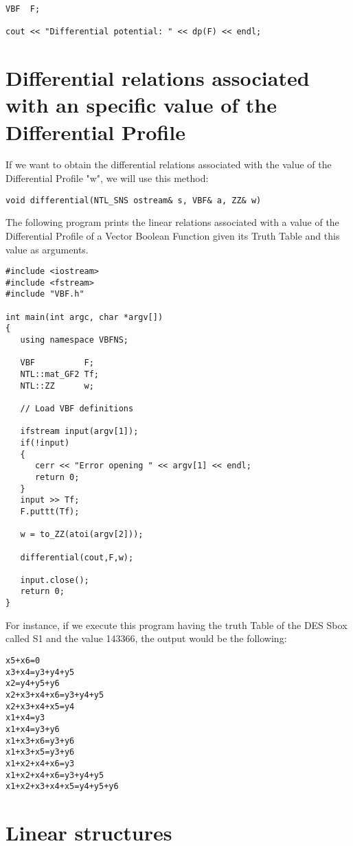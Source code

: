 \begin{verbatim}
VBF  F;

cout << "Differential potential: " << dp(F) << endl;
\end{verbatim}

\section{Differential relations associated with an specific value of the Differential Profile}

If we want to obtain the differential relations associated with the value of the Differential Profile "w", we will use this method:

\begin{verbatim}
void differential(NTL_SNS ostream& s, VBF& a, ZZ& w)
\end{verbatim}

The following program prints the linear relations associated with a value of the Differential Profile of a Vector Boolean Function given its Truth Table and this value as arguments.

\begin{verbatim}
#include <iostream>
#include <fstream>
#include "VBF.h"

int main(int argc, char *argv[])
{
   using namespace VBFNS;

   VBF          F;
   NTL::mat_GF2 Tf;
   NTL::ZZ      w;

   // Load VBF definitions

   ifstream input(argv[1]);
   if(!input)
   {
      cerr << "Error opening " << argv[1] << endl;
      return 0;
   }
   input >> Tf;
   F.puttt(Tf);

   w = to_ZZ(atoi(argv[2]));

   differential(cout,F,w);

   input.close();
   return 0;
}
\end{verbatim}

For instance, if we execute this program having the truth Table of the DES Sbox called S1 and the value 143366, the output would be the following:

\begin{verbatim}
x5+x6=0
x3+x4=y3+y4+y5
x2=y4+y5+y6
x2+x3+x4+x6=y3+y4+y5
x2+x3+x4+x5=y4
x1+x4=y3
x1+x4=y3+y6
x1+x3+x6=y3+y6
x1+x3+x5=y3+y6
x1+x2+x4+x6=y3
x1+x2+x4+x6=y3+y4+y5
x1+x2+x3+x4+x5=y4+y5+y6
\end{verbatim}

\section{Linear structures}

